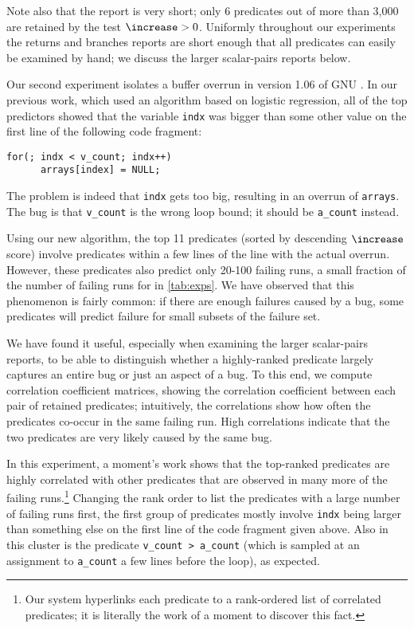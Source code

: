 Note also that the report is very short; only 6 predicates out of more than 3,000 are retained by the test $\increase > 0$.
Uniformly throughout our experiments the returns and branches reports are short enough that all predicates can
easily be examined by hand; we discuss the larger scalar-pairs reports below.

Our second experiment isolates a buffer overrun in version 1.06 of GNU \bc.  In our
previous work, which used an algorithm based on logistic regression, all of the top
predictors showed that the variable \texttt{indx} was bigger than some other value on the first line of the following
code fragment:
\begin{verbatim}
for(; indx < v_count; indx++)
      arrays[index] = NULL;
\end{verbatim}
The problem is indeed that \texttt{indx} gets too big, resulting in an overrun of \texttt{arrays}.  The bug
is that \texttt{v\_count} is the wrong loop bound; it should be \texttt{a\_count} instead.  

Using our new algorithm, the top 11 predicates (sorted by descending
$\increase$ score) involve predicates within a few lines of the line
with the actual overrun.  However, these predicates also predict only
20-100 failing runs, a small fraction of the number of failing runs
for \bc in \autoref{tab:exps}.  We have observed that this
phenomenon is fairly common: if there are enough failures caused by a
bug, some predicates will predict failure for small subsets of the failure set.

We have found it useful, especially when examining the larger
scalar-pairs reports, to be able to distinguish whether a
highly-ranked predicate largely captures an entire bug or just an aspect of a bug.  To
this end, we compute correlation coefficient matrices, showing the correlation coefficient between each pair of retained predicates; 
intuitively, the
correlations show how often the predicates co-occur in the same failing run.  High correlations
indicate that the two predicates are very likely caused by the same bug.

In this experiment, a moment's work shows that the top-ranked predicates are highly
correlated with other predicates that are observed in many more of the
failing runs.\footnote{Our system hyperlinks each predicate to a
rank-ordered list of correlated predicates; it is literally the work
of a moment to discover this fact.}  Changing the rank order to list
the predicates with a large number of failing runs first, the first
group of predicates mostly involve \texttt{indx} being larger than
something else on the first line of the code fragment given above.
Also in this cluster is the predicate \texttt{v\_count > a\_count} (which is sampled at an assignment
to \texttt{a\_count} a few lines before the loop), as
expected.

